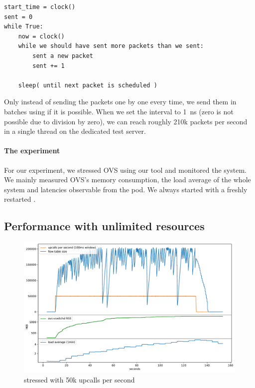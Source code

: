 \begin{verbatim}
start_time = clock()
sent = 0
while True:
    now = clock()
    while we should have sent more packets than we sent:
        sent a new packet
        sent += 1
    
    sleep( until next packet is scheduled )
\end{verbatim}

Only instead of sending the packets one by one every time, we send them in batches using  if it is possible. When we set the interval to \qty{1}{\ns} (zero is not possible due to division by zero), we can reach roughly 210k packets per second in a single thread on the dedicated test server.

\paragraph{The experiment}
For our experiment, we stressed OVS using our tool and monitored the system. We mainly measured OVS's memory consumption, the load average of the whole system and latencies observable from the  pod. We always started with a freshly restarted .

\subsection{Performance with unlimited resources}
\label{subsec:standard-behavior}

\begin{figure}
    \centering
    \includegraphics[width=.9\linewidth]{img/packet_flood_bare_50k.pdf}
    \caption{ stressed with 50k upcalls per second}
    \label{fig:plot-packet-flood-bare-50k}
\end{figure}

